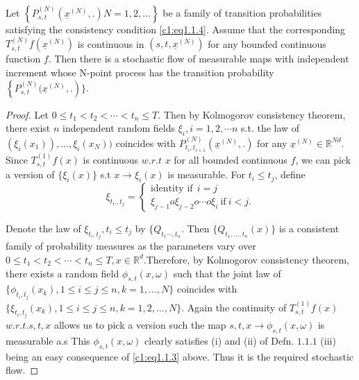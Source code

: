 \setcounter{proposition}{2} 
 \begin{proposition}\label{c1:prop1.1.3} %
   Let $\left\{ P^{(N)}_{s,t} (\underline{x}^{(N)}, .  ) N = 1,2,  \ldots
   \right\}$ be a family of transition probabilities satisfying the
   consistency condition \eqref{c1:eq1.1.4}. Assume that the corresponding
   $T^{(N)}_{s,t} f(\underline{x}^{(N)} )$ is continuous in $(s,t,
   \underline{x}^{(N)})$ for any bounded continuous function $f$. Then
   there is a stochastic flow of measurable maps with independent
   increment whose N-point process has the transition probability
   $\left\{P^{(N)}_{s,t} (\underline{x}^{(N)},. \right)\}$. 
 \end{proposition} 


 \begin{proof}
   Let $0 \le t_1 < t_2 < \cdots < t_n \le T$. Then by Kolmogorov
   consistency theorem, there exist $n$ independent random fields
   $\xi_i,  i = 1,2, \cdots n$ s.t. the law of $(\xi_i (x_1)), \ldots,
   \xi_i (x_N))$ coincides with $P^{(N)}_{t_i, t_{i+1}}
   (\underline{x}^{(N)},.)$ for any $\underline{x}^{(N)} \in
   \mathbb{R}^{Nd}$.  Since $T^{(1)}_{s,t} f(x)$ is continuous $w.r.t$ 
   $x$ for all bounded continuous $f$, we can pick a version of $\{
   \xi_i (x)\}$ s.t $x \rightarrow \xi_i (x) $ is measurable. For $t_i
   \le t_j$, define  
   \begin{equation*}
     \xi_{t_i., t_j} =
     \begin{cases}
       \text{identity if}~~ i = j \\ 
       \xi_{j-1}o \xi_{j-2}o \cdots  o\xi_{i} ~\text{if}~ i < j. 
     \end{cases}
   \end{equation*}

   Denote the law of $\xi_{t_i, t_j}, t_i \le t_j$ by $\{Q_{t_1\cdots,
   t_n}$. Then $\{Q_{t_1, \ldots, t_n} (x)\}$ is a consistent family
   of probability measures as the parameters vary over $0 \le t_1 <
   t_2 < \cdots < t_n \le T, x \in \mathbb{R}^d$.\pageoriginale Therefore,
   by Kolmogorov consistency theorem, there exists a random field
   $\phi_{s,t}(x, \omega)$ such that the joint law of $\{ \phi_{t_i,
     t_j}(x_k),  1 \le i \le j \le n, k=1, \ldots,  N\}$ coincides
   with $\{ \xi_{t_i,  t_j}(x_k),  1 \le i \le j \le n, k=1,2, \ldots,
   N\}$. Again the continuity of $T^{(1)}_{s,t}f(x)$ $w.r.t. s,t,x$
   allows us to pick a version such the map $s,t,x \rightarrow
   \phi_{s,t}(x, \omega)$ is measurable a.s This $\phi_{s,t}(x,
   \omega)$ clearly satisfies (i) and (ii) of Defn. $1.1.1$ (iii)
   being an easy consequence of \eqref{c1:eq1.1.3} above. 
   Thus it is the required  stochastic flow. 
\end{proof} 

